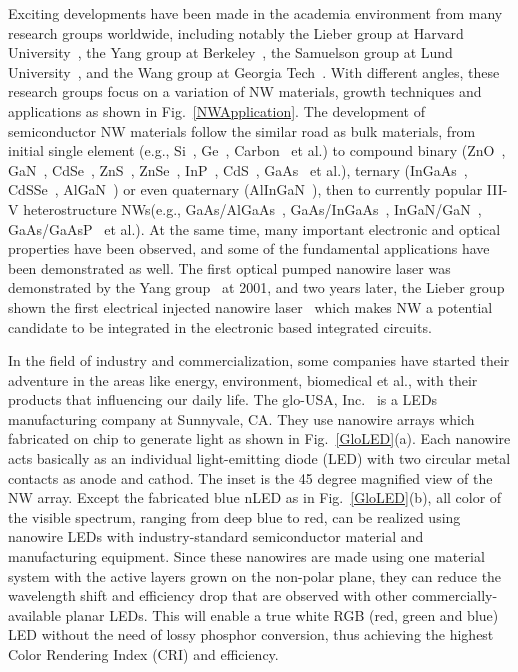 Exciting developments have been made in the academia environment from many
research groups worldwide, including notably the Lieber group at Harvard
University~\cite{Agarwal:2005is,Gradecak:2005eb,Patolsky:2005uz,Duan:2003en,li2006dopant,qian2008multi},
the Yang group at
Berkeley~\cite{Johnson:2003ww,Wu:2002ws,Kind:2002fk,Yang:2002ts,wu2001direct},
the Samuelson group at Lund
University~\cite{Ganjipour:2014cm,Storm:2012gm,Wallentin:2010kf,Thelander:2008uw,Pettersson:2006ft},
and the Wang group at Georgia
Tech~\cite{pan2001nanobelts,wang2006piezoelectric,wang2013nanowires,bae2011fiber,wang2007direct,he2007piezoelectric}.
With different angles, these research groups focus on a variation of NW
materials, growth techniques and applications as shown in
Fig.~\ref{NWApplication}. The development of semiconductor NW materials follow
the similar road as bulk materials, from initial single element (e.g.,
Si~\cite{hochbaum2005controlled}, Ge~\cite{wu2000germanium},
Carbon~\cite{zhao2003carbon} et al.) to compound binary
(ZnO~\cite{Johnson:2003ww}, GaN~\cite{Das:2011ci,Gradecak:2005eb},
CdSe~\cite{Persano:2010if}, ZnS~\cite{Ding:2004di}, ZnSe~\cite{xiang2003green},
InP~\cite{Logeeswaran:2008fw}, CdS~\cite{Ding:2004di}, GaAs~\cite{Joyce:2007bl}
et al.), ternary (InGaAs~\cite{Zhao:2014jt}, CdSSe~\cite{pan2006fabrication},
AlGaN~\cite{Li:2015ira}) or even quaternary (AlInGaN~\cite{Wang:2015bi}), then
to currently popular III-V heterostructure NWs(e.g.,
GaAs/AlGaAs~\cite{Peng:2014ia,Wei:2014ws}, GaAs/InGaAs~\cite{Chen:2011ct},
InGaN/GaN~\cite{Zhang:2016tk}, GaAs/GaAsP~\cite{Hua:2009kf} et al.). At the
same time, many important electronic and optical properties have been observed,
and some of the fundamental applications have been demonstrated as well. The
first optical pumped nanowire laser was demonstrated by the Yang
group~\cite{Huang:2001kv} at 2001, and two years later, the Lieber group shown
the first electrical injected nanowire laser~\cite{Duan:2003en} which makes NW
a potential candidate to be integrated in the electronic based integrated
circuits.

In the field of industry and commercialization, some companies have started
their adventure in the areas like energy, environment, biomedical et al., with
their products that influencing our daily life. The glo-USA,
Inc.~\cite{GloLED:2017} is a LEDs manufacturing company at Sunnyvale, CA. They
use nanowire arrays which fabricated on chip to generate light as shown in
Fig.~\ref{GloLED}(a). Each nanowire acts basically as an individual
light-emitting diode (LED) with two circular metal contacts as anode and
cathod. The inset is the 45 degree magnified view of the NW array. Except the
fabricated blue nLED as in Fig.~\ref{GloLED}(b), all color of the visible
spectrum, ranging from deep blue to red, can be realized using nanowire LEDs
with industry-standard semiconductor material and manufacturing equipment.
Since these nanowires are made using one material system with the active layers
grown on the non-polar plane, they can reduce the wavelength shift and
efficiency drop that are observed with other commercially-available planar
LEDs. This will enable a true white RGB (red, green and blue) LED without the
need of lossy phosphor conversion, thus achieving the highest Color Rendering
Index (CRI) and efficiency.

